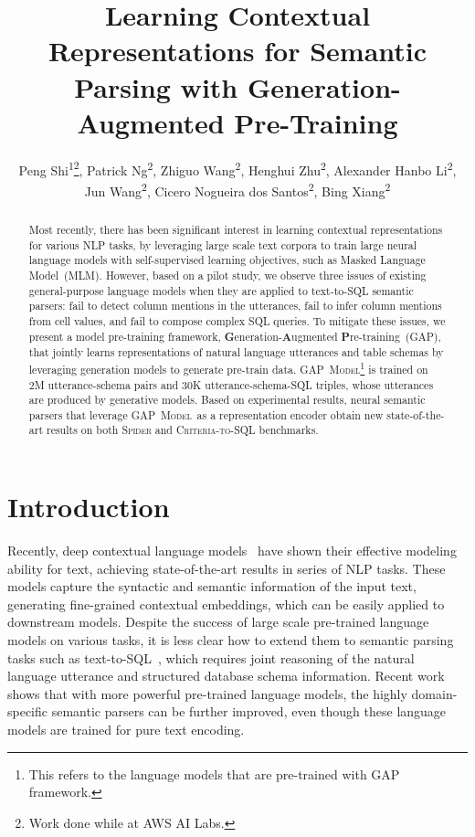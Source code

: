 \documentclass[letterpaper]{article} \usepackage{aaai21}  \usepackage{times}  \usepackage{helvet} \usepackage{courier}  \usepackage[hyphens]{url}  \usepackage{graphicx} \usepackage{booktabs}
\title{Learning Contextual Representations for Semantic Parsing with Generation-Augmented Pre-Training}
\author {
    Peng Shi\textsuperscript{\rm 1}\footnote{Work done while at AWS AI Labs.},
    Patrick Ng\textsuperscript{\rm 2},
    Zhiguo Wang\textsuperscript{\rm 2},
    Henghui Zhu\textsuperscript{\rm 2},
    Alexander Hanbo Li\textsuperscript{\rm 2}, \\
    Jun Wang\textsuperscript{\rm 2},
    Cicero Nogueira dos Santos\textsuperscript{\rm 2},
    Bing Xiang\textsuperscript{\rm 2}  \\
}
\newcommand{\modelnamelm}{\textsc{GAP~Model}}
\begin{document}
\maketitle

\begin{abstract}

Most recently, there has been significant interest in learning contextual representations for various NLP tasks,
by leveraging large scale text corpora to train large neural language models with self-supervised learning objectives, such as Masked Language Model~(MLM).
However, based on a pilot study, we observe three issues of existing general-purpose language models when they are applied to text-to-SQL semantic parsers:
fail to detect column mentions in the utterances, fail to infer column mentions from cell values, and fail to compose complex SQL queries.
To mitigate these issues,
we present a model pre-training framework, \textbf{G}eneration-\textbf{A}ugmented \textbf{P}re-training~(\textsc{GAP}), that jointly learns representations of natural language utterances and table schemas by leveraging generation models to generate pre-train data.
\modelnamelm\footnote{This refers to the language models that are pre-trained with GAP framework.} is trained on 2M utterance-schema pairs and 30K utterance-schema-SQL triples, whose utterances are produced by generative models.
Based on experimental results, neural semantic parsers that leverage \modelnamelm~as a representation encoder obtain new state-of-the-art results on both \textsc{Spider} and \textsc{Criteria-to-SQL} benchmarks.

\end{abstract}

\section{Introduction}

Recently, deep contextual language models~\cite{devlin2018bert, liu2019roberta,lewis2019bart, dong2019unified, raffel2019exploring} have shown their effective modeling ability for text, achieving state-of-the-art results in series of NLP tasks.
These models capture the syntactic and semantic information of the input text, generating fine-grained contextual embeddings, which can be easily applied to downstream models.
Despite the success of large scale pre-trained language models on various tasks, 
it is less clear how to extend them to semantic parsing tasks such as text-to-SQL~\cite{warren1982efficient, popescu2003towards, popescu2004modern, li2006constructing},
which requires joint reasoning of the natural language utterance and structured database schema information.
Recent work~\cite{guo2019towards,wang2019rat, bogin2019representing, bogin2019global} shows that with more powerful pre-trained language models, the highly domain-specific semantic parsers can be further improved, even though these language models are trained for pure text encoding.
\end{document}
